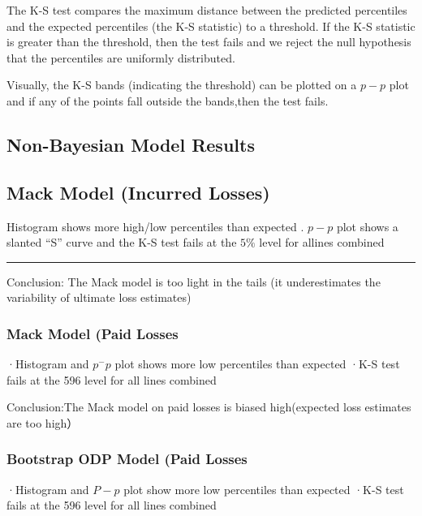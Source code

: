 \documentclass[
]{article}
\begin{document}
The K-S test compares the maximum distance between the predicted
percentiles and the expected percentiles (the K-S statistic) to a
threshold. If the K-S statistic is greater than the threshold, then the
test fails and we reject the null hypothesis that the percentiles are
uniformly distributed.

Visually, the K-S bands (indicating the threshold) can be plotted on a
\(p-p\) plot and if any of the points fall outside the bands,then the
test fails.

\subsection{Non-Bayesian Model
Results}\label{non-bayesian-model-results}

\subsection{Mack Model (Incurred
Losses)}\label{mack-model-incurred-losses}

Histogram shows more high/low percentiles than expected . \(p-p\) plot
shows a slanted ``S'' curve and the K-S test fails at the \(5\%\) level
for allines combined

\begin{center}\rule{0.5\linewidth}{0.5pt}\end{center}

Conclusion: The Mack model is too light in the tails (it underestimates
the variability of ultimate loss estimates)

\subsubsection{Mack Model (Paid Losses}\label{mack-model-paid-losses}

·Histogram and \(p^{-}p\) plot shows more low percentiles than expected
·K-S test fails at the 596 level for all lines combined

Conclusion:The Mack model on paid losses is biased high(expected loss
estimates are too high）

\subsubsection{Bootstrap ODP Model (Paid
Losses}\label{bootstrap-odp-model-paid-losses}

·Histogram and \(P-p\) plot show more low percentiles than expected ·K-S
test fails at the 596 level for all lines combined
\end{document}
